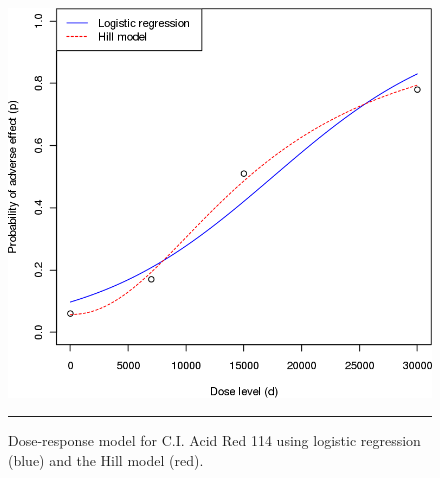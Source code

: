 \begin{figure}[!t]
\centering
  \includegraphics[width=0.5\linewidth]{images/SA/testA9.png}
  \caption[\small Dose-response model for C.I. Acid Red 114 using the Hill model]{\small Dose-response model for C.I. Acid Red 114 using logistic regression (blue) and the Hill model (red).}
  \label{fig:testA9}\hrule
\end{figure}



